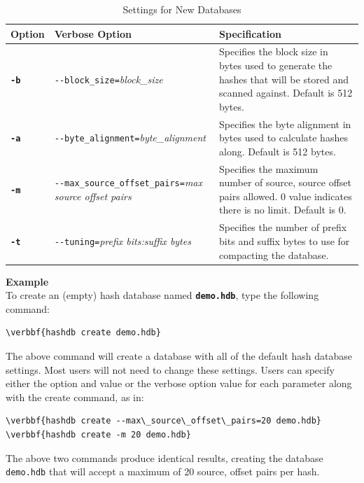 \documentclass[11pt,fleqn]{article} %
\begin{document}
\begin{table}[!ht]
\centering
\caption{Settings for New Databases}
\label{tab:hashDBSettings}
\begin{tabular}{|p{1.5 cm}|p{8 cm}|p{4 cm}|}
\hline \hline
\textbf{Option} & \textbf{Verbose Option} & \textbf{Specification} \\
\hline
\textbf{\texttt{-b}} & \verb+--block_size=+\textit{block\_size} & Specifies the block size in bytes used to generate the hashes that will be stored and scanned against. Default is 512 bytes.  \\
\hline
\textbf{\texttt{-a}} & \verb+--byte_alignment=+\textit{byte\_alignment} & Specifies the byte alignment in bytes used to calculate hashes along. Default is 512 bytes.  \\
\hline
\textbf{\texttt{-m}} & \verb+--max_source_offset_pairs=+\textit{max source offset pairs} & Specifies the maximum number of source, source offset pairs allowed. 0 value indicates there is no limit. Default is 0.\\
\hline
\textbf{\texttt{-t}} & \verb+--tuning=+\textit{prefix bits:suffix bytes} & Specifies the number of prefix bits and suffix bytes to use for compacting the database.\\
\hline
\end{tabular}
\end{table}

\textbf{Example}\\
To create an (empty) hash database named \textbf{\texttt{demo.hdb}}, type the following command:
\begin{Verbatim}[commandchars=\\\{\}]
\verbbf{hashdb create demo.hdb}
\end{Verbatim}
The above command will create a database with all of the default hash database settings. Most users will not need to change these settings.
Users can specify either the option and value or the verbose option value for each parameter along with the create command, as in:\\
\begin{Verbatim}[commandchars=\\\{\}]
\verbbf{hashdb create --max\_source\_offset\_pairs=20 demo.hdb}
\verbbf{hashdb create -m 20 demo.hdb}
\end{Verbatim}
The above two commands produce identical results, creating the database \texttt{demo.hdb} that will accept a maximum of 20 source, offset pairs per hash.\\
\end{document}
